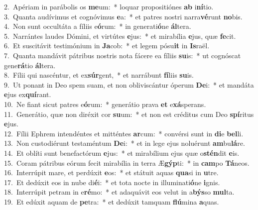 {2.~}Apériam in parábolis os \textbf{me}um:~* loquar propositiónes \textbf{ab} i\textbf{ní}tio.\\
{3.~}Quanta audívimus et cognóvimus \textbf{e}a:~* et patres nostri narra\textbf{vé}runt \textbf{no}bis.\\
{4.~}Non sunt occultáta a fíliis e\textbf{ó}rum:~* in generati\textbf{ó}ne \textbf{ál}tera.\\
{5.~}Narrántes laudes Dómini, et virtútes \textbf{e}jus:~* et mirabília \textbf{e}jus, quæ \textbf{fe}cit.\\
{6.~}Et suscitávit testimónium in \textbf{Ja}cob:~* et legem pósu\textbf{it} in \textbf{Is}raël.\\
{7.~}Quanta mandávit pátribus nostris nota fácere ea fíliis \textbf{su}is:~* ut cognóscat gene\textbf{rá}tio \textbf{ál}tera.\\
{8.~}Fílii qui nascéntur, et ex\textbf{súr}gent,~* et narrábunt \textbf{fí}liis \textbf{su}is.\\
{9.~}Ut ponant in Deo spem suam, et non obliviscántur óperum \textbf{De}i:~* et mandáta \textbf{e}jus ex\textbf{quí}rant.\\
{10.~}Ne fiant sicut patres e\textbf{ó}rum:~* generátio prava \textbf{et} e\textbf{xá}sperans.\\
{11.~}Generátio, quæ non diréxit cor \textbf{su}um:~* et non est créditus cum Deo \textbf{spí}ritus \textbf{e}jus.\\
{12.~}Fílii Ephrem intendéntes et mitténtes \textbf{ar}cum:~* convérsi sunt in \textbf{di}e \textbf{bel}li.\\
{13.~}Non custodiérunt testaméntum \textbf{De}i:~* et in lege ejus noluérunt \textbf{am}bu\textbf{lá}re.\\
{14.~}Et oblíti sunt benefactórum \textbf{e}jus:~* et mirabílium ejus quæ o\textbf{stén}dit \textbf{e}is.\\
{15.~}Coram pátribus eórum fecit mirabília in terra Æ\textbf{gýp}ti:~* in \textbf{cam}po \textbf{Tá}neos.\\
{16.~}Interrúpit mare, et perdúxit \textbf{e}os:~* et státuit aquas \textbf{qua}si in \textbf{u}tre.\\
{17.~}Et dedúxit eos in nube di\textbf{é}i:~* et tota nocte in illuminati\textbf{ó}ne \textbf{i}gnis.\\
{18.~}Interrúpit petram in e\textbf{ré}mo:~* et adaquávit eos velut in a\textbf{býs}so \textbf{mul}ta.\\
{19.~}Et edúxit aquam de \textbf{pe}tra:~* et dedúxit tamquam \textbf{flú}mina \textbf{a}quas.\\
